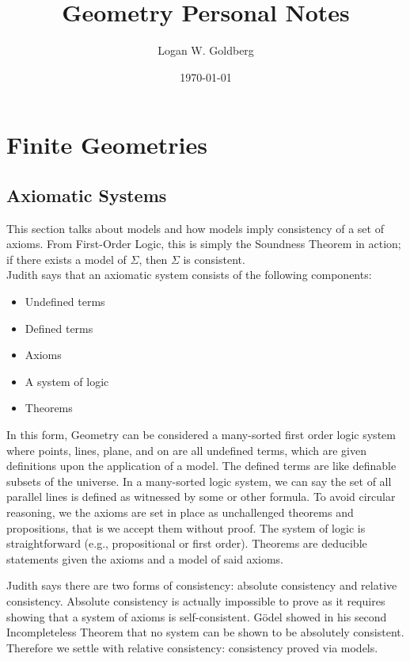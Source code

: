 \documentclass[12pt]{book}
\title{Geometry Personal Notes}
\author{Logan W. Goldberg}
\date{\today}
\begin{document}
\maketitle
\tableofcontents

\chapter{Finite Geometries}
\section{Axiomatic Systems}

This section talks about models and how models imply consistency of a set of axioms. From First-Order Logic, this is simply the Soundness Theorem in action; if there exists a model of $\Sigma$, then $\Sigma$ is consistent. \\

Judith says that an axiomatic system consists of the following components:
\begin{itemize}[nolistsep]
\item Undefined terms
\item Defined terms
\item Axioms
\item A system of logic
\item Theorems\\
\end{itemize}

In this form, Geometry can be considered a many-sorted first order logic system where points, lines, plane, and on are all undefined terms, which are given definitions upon the application of a model. The defined terms are like definable subsets of the universe. In a many-sorted logic system, we can say the set of all parallel lines is defined as witnessed by some or other formula. To avoid circular reasoning, we the axioms are set in place as unchallenged theorems and propositions, that is we accept them without proof. The system of logic is straightforward (e.g., propositional or first order). Theorems are deducible statements given the axioms and a model of said axioms.

Judith says there are two forms of consistency: absolute consistency and relative consistency. Absolute consistency is actually impossible to prove as it requires showing that a system of axioms is self-consistent. G{\"o}del showed in his second Incompleteless Theorem that no system can be shown to be absolutely consistent. Therefore we settle with relative consistency: consistency proved via models. 
\end{document}
